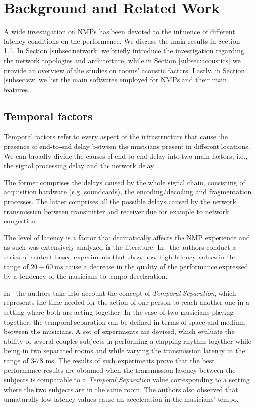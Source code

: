\section{Background and Related Work}\label{sec:background}
A wide investigation on NMPs has been devoted to the influence of different latency conditions on the performance. We discuss the main results in Section \ref{subsec:temporal}. In Section \ref{subsec:network} we briefly introduce the investigation regarding the network topologies and architecture, while in Section \ref{subsec:acoustics} we provide an overview of the studies on rooms' acoustic factors. Lastly, in Section \ref{subsec:sw} we list the main softwares employed for NMPs and their main features.

\subsection{Temporal factors}\label{subsec:temporal}
Temporal factors refer to every aspect of the infrastructure that cause the presence of end-to-end delay between the musicians present in different locations. We can broadly divide the causes of end-to-end delay into two main factors, i.e., the signal processing delay and the network delay \cite{Lakiotakis}. 

The former comprises the delays caused by the whole signal chain, consisting of acquisition hardware (e.g. soundcards), the encoding/decoding and fragmentation processes. The latter comprises all the possible delays caused by the network transmission between transmitter and receiver due for example to network congestion.

The level of latency is a factor that dramatically affects the NMP experience and as such was extensively analyzed in the literature. In~\cite{RottondiFeature} the authors conduct a series of content-based experiments that show how high latency values in the range of $20-60~\mathrm{ms}$ cause a decrease in the quality of the performance expressed by a tendency of the musicians to tempo deceleration. 

In~\cite{Chafe1,Chafe2,Chafe3} the authors take into account the concept of \textit{Temporal Separation}, which represents the time needed for the action of one person to reach another one in a setting where both are acting together. In the case of two musicians playing together, the temporal separation can be defined in terms of space and medium between the musicians. A set of experiments are devised, which evaluate the ability of several couples subjects in performing a clapping rhythm together while being in two separated rooms and while varying the transmission latency in the range of 3-78 ms. The results of such experiments prove that the best performance results are obtained when the transmission latency between the subjects is comparable to a \textit{Temporal Separation} value corresponding to a setting where the two subjects are in the same room. The authors also observed that unnaturally low latency values cause an acceleration in the musicians' tempo.

